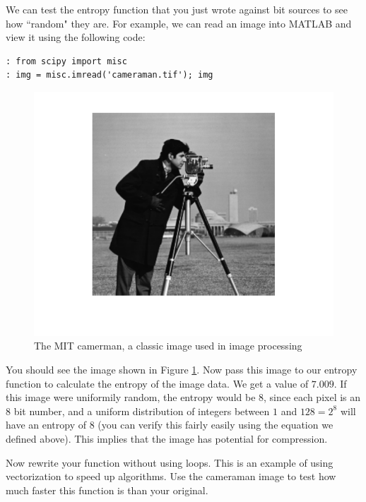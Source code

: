 We can test the entropy function that you just wrote against bit sources to see how ``random" they are. For example, we can read an image into MATLAB and view it using the following code:
\begin{lstlisting}
: from scipy import misc
: img = misc.imread('cameraman.tif'); img
\end{lstlisting}

\begin{figure}[h!]
\begin{center}
\includegraphics{./Figures/cameramanClean.pdf}
\end{center}
\caption{The MIT camerman, a classic image used in image processing}
\label{fig:cameramanclean}
\end{figure}
You should see the image shown in Figure \ref{fig:cameramanclean}. Now pass this image to our entropy function to calculate the entropy of the image data. We get a value of $7.009$. If this image were uniformily random, the entropy would be $8$, since each pixel is an $8$ bit number, and a uniform distribution of integers between $1$ and $128 = 2^8$ will have an entropy of $8$ (you can verify this fairly easily using the equation we defined above). This implies that the image has potential for compression.

\begin{problem}
Now rewrite your function without using loops. This is an example of using vectorization to speed up algorithms. Use the cameraman image to test how much faster this function is than your original.
\end{problem}

